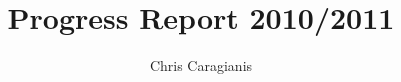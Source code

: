 \documentclass[12pt]{article}
\theoremstyle{definition}
\begin{document}
\author{Chris Caragianis}
\title{Progress Report 2010/2011}






		

%
\end{document}
